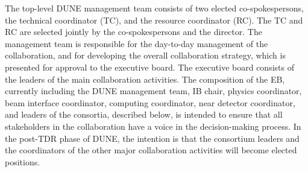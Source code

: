 The top-level DUNE management team consists of two elected co-spokespersons, the technical coordinator (TC), and the resource coordinator (RC). The TC and RC are selected jointly by the co-spokespersons and the \fnal director. The management team is responsible for the day-to-day management of the collaboration, and for developing the overall collaboration strategy, which is presented for approval to the executive board. The executive board consists of the leaders of the main collaboration activities. The composition of the EB, currently including the DUNE management team, IB chair, physics coordinator, beam interface coordinator, computing coordinator, near detector coordinator, and leaders of the  consortia, described below, is intended to ensure
that all stakeholders in the collaboration have a voice in the decision-making process. 
In the post-TDR phase of DUNE, the intention is that the consortium leaders and the coordinators of the other major collaboration activities will become elected positions.

